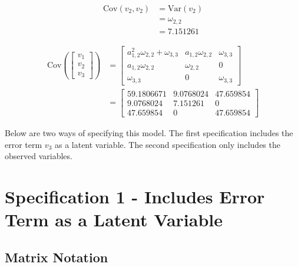 \documentclass[
]{book}
\begin{document}
\begin{equation}
  \begin{split}
    \mathrm{Cov} \left( v_2, v_2 \right)
    &=
    \mathrm{Var} \left( v_2 \right) \\
    &=
    \omega_{2, 2} \\
    &=
    7.151261
  \end{split}
\end{equation}

\begin{equation}
  \begin{split}
    \mathrm{Cov}
    \left(
      \begin{bmatrix}
        v_1 \\
        v_2 \\
        v_3
      \end{bmatrix}
    \right)
    &=
    \begin{bmatrix}
      a_{1, 2}^{2} \omega_{2, 2} + \omega_{3, 3} & a_{1, 2} \omega_{2, 2} & \omega_{3, 3} \\
      a_{1, 2} \omega_{2, 2} & \omega_{2, 2} & 0 \\
      \omega_{3, 3} & 0 & \omega_{3, 3}
    \end{bmatrix} \\
    &=
    \begin{bmatrix}
      59.1806671 & 9.0768024 & 47.659854 \\
      9.0768024 & 7.151261 & 0 \\
      47.659854 & 0 & 47.659854
    \end{bmatrix}
  \end{split}
\end{equation}

Below are two ways of specifying this model.
The first specification includes the error term \(v_3\) as a latent variable.
The second specification only includes the observed variables.

\hypertarget{specification-1---includes-error-term-as-a-latent-variable}{%
\section{Specification 1 - Includes Error Term as a Latent Variable}\label{specification-1---includes-error-term-as-a-latent-variable}}

\hypertarget{matrix-notation}{%
\subsection{Matrix Notation}\label{matrix-notation}}
\end{document}
